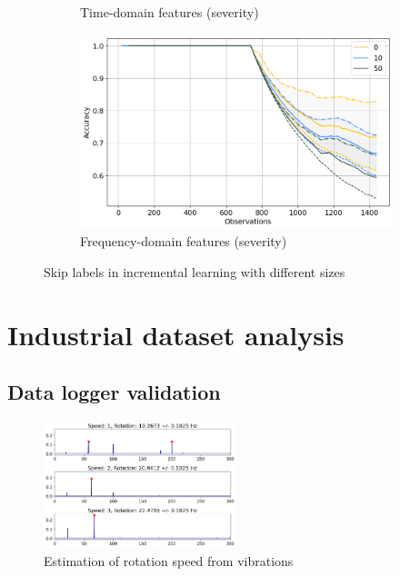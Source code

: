 \begin{figure}[h]
\begin{subfigure}[b]{0.48\textwidth}
        \caption{Time-domain features (severity)}
    \end{subfigure}
    \hfill
    \begin{subfigure}[b]{0.48\textwidth}
        \includegraphics[width=\textwidth]{assets/results/incremental-learning/skip-label-FD-severity.png}
        \caption{Frequency-domain features (severity)}
    \end{subfigure} 
    \caption{Skip labels in incremental learning with different sizes}
\end{figure}



\section{Industrial dataset analysis}

\subsection{Data logger validation}

\begin{figure}[ht]
    \centering
    \includegraphics[width=0.5\textwidth]{assets/results/standing-fan/standing-fan-accel.png}
    \caption{Estimation of rotation speed from vibrations}
\end{figure}


